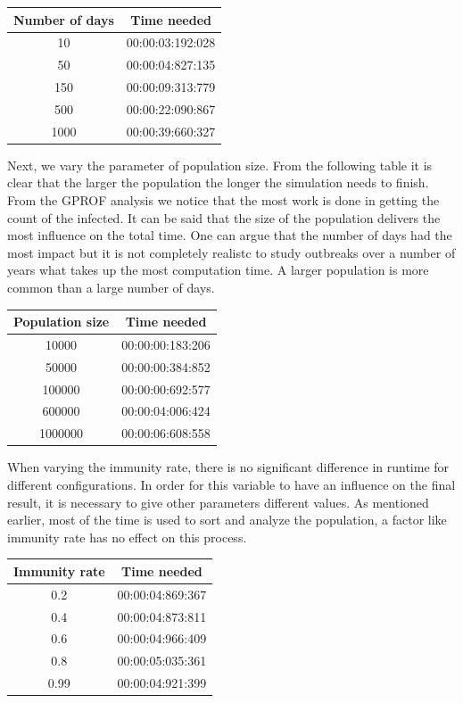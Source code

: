 \documentclass[runningheads]{llncs}
\begin{document}
\begin{center}
	\begin{tabular}{ | c | c |}
	\hline
	Number of days & Time needed \\ \hline
	10 & 00:00:03:192:028 \\ \hline
	50 & 00:00:04:827:135 \\ \hline
	150 & 00:00:09:313:779 \\ \hline
	500 & 00:00:22:090:867 \\ \hline
	1000 & 00:00:39:660:327 \\
	\hline	
	\end{tabular}
\end{center}

\noindent
Next, we vary the parameter of population size. From the following table it is clear that the larger the population the longer the simulation needs to finish. From the GPROF analysis we notice that the most work is done in getting the count of the infected. It can be said that the size of the population delivers the most influence on the total time. One can argue that the number of days had the most impact but it is not completely realistc to study outbreaks over a number of years what takes up the most computation time. A larger population is more common than a large number of days.

\begin{center}
	\begin{tabular}{ | c | c |}
		\hline
		Population size & Time needed \\ \hline
		10000 & 00:00:00:183:206 \\ \hline
		50000 & 00:00:00:384:852 \\ \hline
		100000 & 00:00:00:692:577 \\ \hline
		600000 & 00:00:04:006:424 \\ \hline
		1000000 & 00:00:06:608:558 \\
		\hline	
	\end{tabular}
\end{center} 
\newpage
\noindent
When varying the immunity rate, there is no significant difference in runtime for different configurations. In order for this variable to have an influence on the final result, it is necessary to give other parameters different values.  As mentioned earlier, most of the time is used to sort and analyze the population, a factor like immunity rate has no effect on this process.

\begin{center}
	\begin{tabular}{ | c | c |}
		\hline
		Immunity rate & Time needed \\ \hline
		0.2 & 00:00:04:869:367 \\ \hline
		0.4 & 00:00:04:873:811 \\ \hline
		0.6 & 00:00:04:966:409 \\ \hline
		0.8 & 00:00:05:035:361 \\ \hline
		0.99 & 00:00:04:921:399 \\
		\hline	
	\end{tabular}
\end{center}
 
\end{document}
